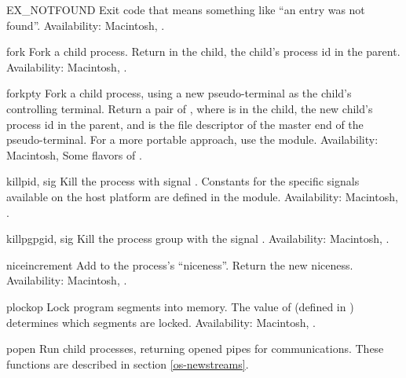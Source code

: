\begin{datadesc}{EX_NOTFOUND}
Exit code that means something like ``an entry was not found''.
Availability: Macintosh, \UNIX.
\end{datadesc}

\begin{funcdesc}{fork}{}
Fork a child process.  Return  in the child, the child's
process id in the parent.
Availability: Macintosh, \UNIX.
\end{funcdesc}

\begin{funcdesc}{forkpty}{}
Fork a child process, using a new pseudo-terminal as the child's
controlling terminal. Return a pair of ,
where  is  in the child, the new child's process id
in the parent, and  is the file descriptor of the master end
of the pseudo-terminal.  For a more portable approach, use the
 module.
Availability: Macintosh, Some flavors of \UNIX.
\end{funcdesc}

\begin{funcdesc}{kill}{pid, sig}
Kill the process  with signal .  Constants for the
specific signals available on the host platform are defined in the
 module.
Availability: Macintosh, \UNIX.
\end{funcdesc}

\begin{funcdesc}{killpg}{pgid, sig}
Kill the process group  with the signal .
Availability: Macintosh, \UNIX.
\end{funcdesc}

\begin{funcdesc}{nice}{increment}
Add  to the process's ``niceness''.  Return the new
niceness.
Availability: Macintosh, \UNIX.
\end{funcdesc}

\begin{funcdesc}{plock}{op}
Lock program segments into memory.  The value of 
(defined in ) determines which segments are locked.
Availability: Macintosh, \UNIX.
\end{funcdesc}

\begin{funcdescni}{popen}{\unspecified}
Run child processes, returning opened pipes for communications.  These
functions are described in section \ref{os-newstreams}.
\end{funcdescni}

